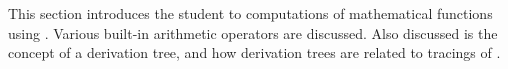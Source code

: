 \label{fish22}

This section introduces the student to computations of mathematical functions
using \prolog. Various built-in arithmetic operators are discussed. Also
discussed is the concept of a \prolog derivation tree, and how derivation trees
are related to tracings of \prolog.

 

